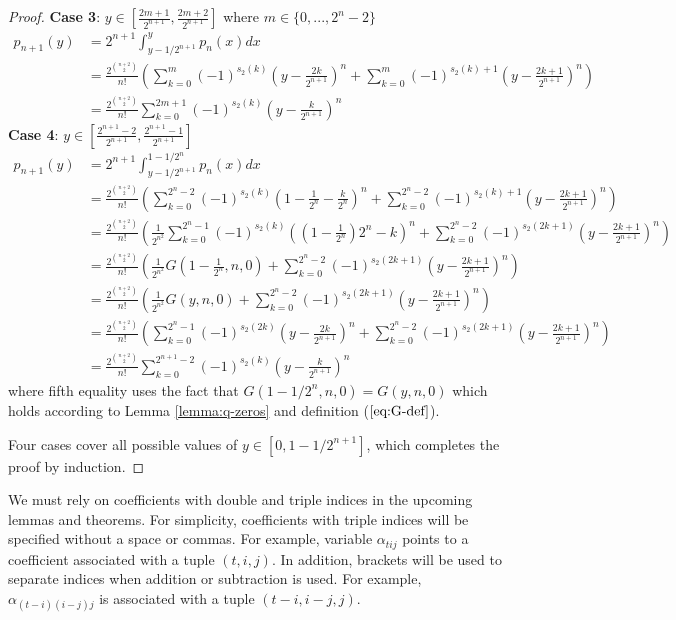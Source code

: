 \documentclass{article}
\begin{document}
\begin{proof}
\textbf{Case 3}: $y \in \left[\frac{2m+1}{2^{n+1}}, \frac{2m+2}{2^{n+1}}\right]$ where $m \in \{0, ..., 2^n-2\}$
\begin{align*}
p_{n+1}(y)
&=
  2^{n+1}
  \int_{y-1/2^{n+1}}^{y} p_n(x) dx \\
&=
  \frac{2^{\binom{n+2}{2}}}{n!}
  \left(
    \sum_{k=0}^{m} (-1)^{s_2(k)}\left(y-\frac{2k}{2^{n+1}}\right)^n
    +\sum_{k=0}^{m} (-1)^{s_2(k)+1}\left(y-\frac{2k+1}{2^{n+1}}\right)^n
  \right) \\
&=
  \frac{2^{\binom{n+2}{2}}}{n!}
  \sum_{k=0}^{2m+1}
    (-1)^{s_2(k)}
    \left(y-\frac{k}{2^{n+1}}\right)^n 
\end{align*}
\textbf{Case 4}: $y \in \left[\frac{2^{n+1}-2}{2^{n+1}}, \frac{2^{n+1}-1}{2^{n+1}}\right]$
\begin{align*}
p_{n+1}(y)
&=
  2^{n+1}
  \int_{y-1/2^{n+1}}^{1-1/2^n}
    p_n(x)
    dx \\
&= 
  \frac{2^{\binom{n+2}{2}}}{n!}
  \left(
    \sum_{k=0}^{2^{n}-2}
      (-1)^{s_2(k)}\left(1-\frac{1}{2^n}-\frac{k}{2^{n}}\right)^n
    +
    \sum_{k=0}^{2^{n}-2}
      (-1)^{s_2(k)+1}\left(y-\frac{2k+1}{2^{n+1}}\right)^n
  \right) \\
&= 
  \frac{2^{\binom{n+2}{2}}}{n!}
  \left(
    \frac{1}{2^{n^2}}
    \sum_{k=0}^{2^{n}-1}
      (-1)^{s_2(k)}
      \left(\left(1-\frac{1}{2^n}\right)2^n-k\right)^n
    +
    \sum_{k=0}^{2^{n}-2}
      (-1)^{s_2(2k+1)}\left(y-\frac{2k+1}{2^{n+1}}\right)^n
  \right) \\
&= 
  \frac{2^{\binom{n+2}{2}}}{n!}
  \left(
    \frac{1}{2^{n^2}}
    G\left(1-\frac{1}{2^n},n,0\right)
    +
    \sum_{k=0}^{2^{n}-2}
      (-1)^{s_2(2k+1)}\left(y-\frac{2k+1}{2^{n+1}}\right)^n
  \right) \\
&= 
  \frac{2^{\binom{n+2}{2}}}{n!}
  \left(
    \frac{1}{2^{n^2}}
    G\left(y,n,0\right)
    +
    \sum_{k=0}^{2^{n}-2}
      (-1)^{s_2(2k+1)}\left(y-\frac{2k+1}{2^{n+1}}\right)^n
  \right) \\
&= 
  \frac{2^{\binom{n+2}{2}}}{n!}
  \left(
    \sum_{k=0}^{2^{n}-1}
      (-1)^{s_2(2k)}
      \left(y-\frac{2k}{2^{n+1}}\right)^n
    +
    \sum_{k=0}^{2^{n}-2}
      (-1)^{s_2(2k+1)}\left(y-\frac{2k+1}{2^{n+1}}\right)^n
  \right) \\
&=
  \frac{2^{\binom{n+2}{2}}}{n!}
  \sum_{k=0}^{2^{n+1}-2}
    (-1)^{s_2(k)}
    \left(y-\frac{k}{2^{n+1}}\right)^n 
\end{align*}
where fifth equality uses the fact that $G\left(1-1/2^n,n,0\right) = G\left(y,n,0\right)$ which holds according to Lemma \ref{lemma:q-zeros} and definition ($\ref{eq:G-def}$).

Four cases cover all possible values of $y \in [0, 1-1/2^{n+1}]$, which completes the proof by induction.
\end{proof}
We must rely on coefficients with double and triple indices in the upcoming lemmas and theorems. For simplicity, coefficients with triple indices will be specified without a space or commas. For example, variable $\alpha_{tij}$ points to a coefficient associated with a tuple $(t, i, j)$. In addition, brackets will be used to separate indices when addition or subtraction is used. For example, $\alpha_{(t-i)(i-j)j}$ is associated with a tuple $(t-i, i-j, j)$.
\end{document}

